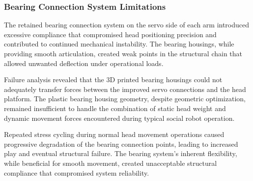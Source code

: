 \subsubsection{Bearing Connection System Limitations}

The retained bearing connection system on the servo side of each arm introduced excessive compliance that compromised head positioning precision and contributed to continued mechanical instability. The bearing housings, while providing smooth articulation, created weak points in the structural chain that allowed unwanted deflection under operational loads.

Failure analysis revealed that the 3D printed bearing housings could not adequately transfer forces between the improved servo connections and the head platform. The plastic bearing housing geometry, despite geometric optimization, remained insufficient to handle the combination of static head weight and dynamic movement forces encountered during typical social robot operation.

Repeated stress cycling during normal head movement operations caused progressive degradation of the bearing connection points, leading to increased play and eventual structural failure. The bearing system's inherent flexibility, while beneficial for smooth movement, created unacceptable structural compliance that compromised system reliability.

